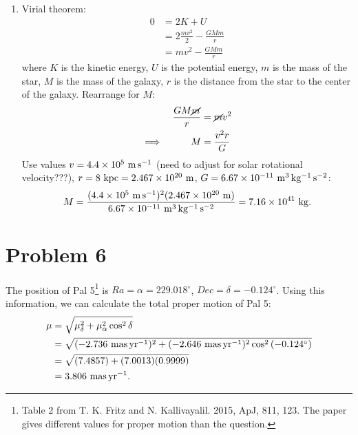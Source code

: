 \documentclass[11pt,letterpaper]{article}
\begin{document}
\begin{enumerate}[label=(\alph*)]
    \item Virial theorem:
        \begin{align*}
            0 &= 2K + U \\
            &= 2\frac{mv^2}{2} - \frac{GMm}{r} \\
            &= mv^2 - \frac{GMm}{r}
        \end{align*}
        where $K$ is the kinetic energy, $U$ is the potential energy, $m$ is the mass of the star, $M$ is the mass of the galaxy, $r$ is the distance from the star to the center of the galaxy. Rearrange for $M$:
        \begin{alignat*}{2}
            &&\frac{GM\cancel{m}}{r} &= \cancel{m}v^2 \\
            \implies&&M &= \frac{v^2 r}{G}
        \end{alignat*}
        Use values $v=4.4\times 10^{5}~{\rm m\,s^{-1}}$ (need to adjust for solar rotational velocity???), $r = 8~{\rm kpc} = 2.467\times 10^{20}~{\rm m}$, $G = 6.67\times 10^{-11}~{\rm m^3\,kg^{-1}\,s^{-2}}$:
        \begin{align*}
            M = \frac{(4.4\times 10^{5}~{\rm m\,s^{-1}})^2(2.467\times 10^{20}~{\rm m})}{6.67\times 10^{-11}~{\rm m^3\,kg^{-1}\,s^{-2}}} = 7.16\times 10^{41}~{\rm kg}.
        \end{align*}



\end{enumerate}

\section*{Problem 6} 

The position of Pal 5\footnote{Table 2 from T. K. Fritz and N. Kallivayalil. 2015, ApJ, 811, 123. The paper gives different values for proper motion than the question.} is $Ra=\alpha = 229.018^\circ$, $Dec = \delta = -0.124^\circ$. Using this information, we can calculate the total proper motion of Pal 5:
        \begin{align*}
            \mu &= \sqrt{\mu_\delta^2 + \mu_\alpha^2\cos^2{\delta}} \\
            &= \sqrt{(-2.736~{\rm mas\,yr^{-1}})^2 + (-2.646~{\rm mas\,yr^{-1}})^2\cos^2{(-0.124^\circ)}} \\
            &= \sqrt{(7.4857) + (7.0013)(0.9999)} \\
            &= 3.806~{\rm mas\,yr^{-1}}. 
        \end{align*}
\end{document}
